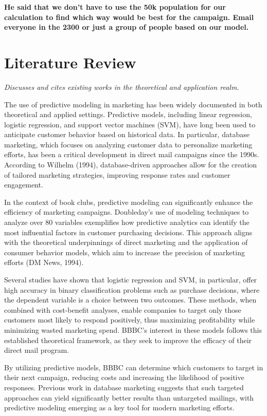 \documentclass[
]{article}
\begin{document}
\textbf{He said that we don't have to use the 50k population for our
calculation to find which way would be best for the campaign. Email
everyone in the 2300 or just a group of people based on our model.}

\hypertarget{literature-review}{%
\section{Literature Review}\label{literature-review}}

\emph{Discusses and cites existing works in the theoretical and
application realm.}

The use of predictive modeling in marketing has been widely documented
in both theoretical and applied settings. Predictive models, including
linear regression, logistic regression, and support vector machines
(SVM), have long been used to anticipate customer behavior based on
historical data. In particular, database marketing, which focuses on
analyzing customer data to personalize marketing efforts, has been a
critical development in direct mail campaigns since the 1990s. According
to Wilhelm (1994), database-driven approaches allow for the creation of
tailored marketing strategies, improving response rates and customer
engagement.

In the context of book clubs, predictive modeling can significantly
enhance the efficiency of marketing campaigns. Doubleday's use of
modeling techniques to analyze over 80 variables exemplifies how
predictive analytics can identify the most influential factors in
customer purchasing decisions. This approach aligns with the theoretical
underpinnings of direct marketing and the application of consumer
behavior models, which aim to increase the precision of marketing
efforts (DM News, 1994).

Several studies have shown that logistic regression and SVM, in
particular, offer high accuracy in binary classification problems such
as purchase decisions, where the dependent variable is a choice between
two outcomes. These methods, when combined with cost-benefit analyses,
enable companies to target only those customers most likely to respond
positively, thus maximizing profitability while minimizing wasted
marketing spend. BBBC's interest in these models follows this
established theoretical framework, as they seek to improve the efficacy
of their direct mail program.

By utilizing predictive models, BBBC can determine which customers to
target in their next campaign, reducing costs and increasing the
likelihood of positive responses. Previous work in database marketing
suggests that such targeted approaches can yield significantly better
results than untargeted mailings, with predictive modeling emerging as a
key tool for modern marketing efforts.
\end{document}
